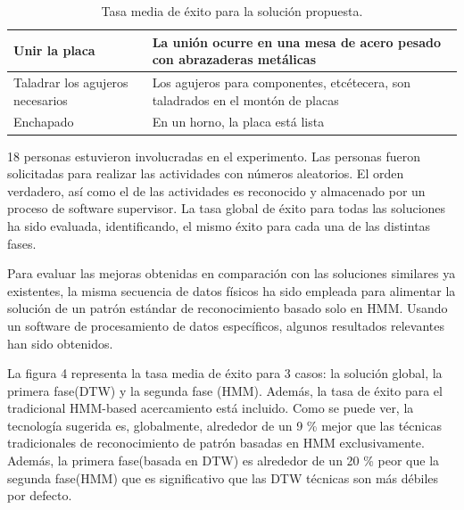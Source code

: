 \documentclass{article}
\begin{document}
\begin{table}[h]
\begin{center}
\begin{tabular}{ | p{4cm} | p{9cm} | }
			Unir la placa                                      & La unión ocurre en una mesa de acero pesado con abrazaderas metálicas                                                    \\ \hline
			Taladrar los agujeros necesarios                   & Los agujeros para componentes, etcétecera, son taladrados en el montón de placas                                         \\ \hline
			Enchapado                                          & En un horno, la placa está lista                                                                                         \\ \hline
		\end{tabular}
	\end{center}
\caption{\label{fig:frog}Tasa media de éxito para la solución propuesta.}
\end{table}


18 personas estuvieron involucradas en el experimento. Las personas fueron solicitadas para realizar las actividades con números aleatorios. El orden verdadero, así como el de las actividades es reconocido y almacenado por un proceso de software supervisor. La tasa global de éxito para todas las soluciones ha sido evaluada, identificando, el mismo éxito para cada una de las distintas fases.

Para evaluar las mejoras obtenidas en comparación con las soluciones similares ya existentes, la misma secuencia de datos físicos ha sido empleada para alimentar la solución de un patrón estándar de reconocimiento basado solo en HMM. Usando un software de procesamiento de datos específicos, algunos resultados relevantes han sido obtenidos.

La figura 4 representa la tasa media de éxito para 3 casos: la solución global, la primera fase(DTW) y la segunda fase (HMM). Además, la tasa de éxito para el tradicional HMM-based acercamiento está incluido. Como se puede ver, la tecnología sugerida es, globalmente, alrededor de un 9 \% mejor que  las técnicas tradicionales de reconocimiento de patrón basadas en HMM exclusivamente. Además, la primera fase(basada en DTW) es alrededor de un 20 \% peor que la segunda fase(HMM) que es significativo que las DTW técnicas son más débiles por defecto.
\end{document}

